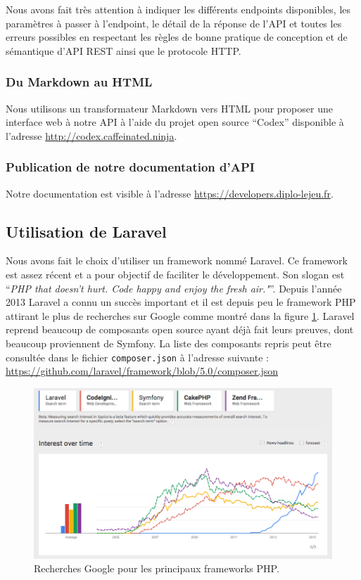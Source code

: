 			Nous avons fait très attention à indiquer les différents endpoints disponibles, les paramètres à passer à l'endpoint, le détail de la réponse de l'API et toutes les erreurs possibles en respectant les règles de bonne pratique de conception et de sémantique d'API REST ainsi que le protocole HTTP.

		\subsubsection{Du Markdown au HTML}
			Nous utilisons un transformateur Markdown vers HTML pour proposer une interface web à notre API à l'aide du projet open source \enquote{Codex} disponible à l'adresse \url{http://codex.caffeinated.ninja}.\\

		\subsubsection{Publication de notre documentation d'API}
			Notre documentation est visible à l'adresse \url{https://developers.diplo-lejeu.fr}.

	\subsection{Utilisation de Laravel}
		Nous avons fait le choix d'utiliser un framework nommé Laravel. Ce framework est assez récent et a pour objectif de faciliter le développement. Son slogan est \enquote{\textit{PHP that doesn't hurt. Code happy and enjoy the fresh air."}}. Depuis l'année 2013 Laravel a connu un succès important et il est depuis peu le framework PHP attirant le plus de recherches sur Google comme montré dans la figure \ref{fig:trends-php-frameworks}. Laravel reprend beaucoup de composants open source ayant déjà fait leurs preuves, dont beaucoup proviennent de Symfony. La liste des composants repris peut être consultée dans le fichier \texttt{composer.json} à l'adresse suivante : \url{https://github.com/laravel/framework/blob/5.0/composer.json}

		\begin{figure}[H]
			\centering
			\includegraphics[width=1\textwidth]{images/trends-php-frameworks.png}
			\caption{Recherches Google pour les principaux frameworks PHP.}
			\label{fig:trends-php-frameworks}
		\end{figure}

